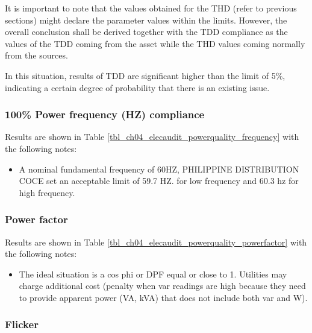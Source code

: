 It is important to note that the values obtained for the THD (refer to previous sections) might declare the parameter values within the limits. However, the overall conclusion shall be derived together with the TDD compliance as the values of the TDD coming from the asset while the THD values coming normally from the sources. 




In this situation, results of TDD are significant higher than the limit of 5\%, indicating a certain degree of probability that there is an existing issue.



\subsubsection{100\% Power frequency (HZ) compliance}

Results are shown in Table \ref{tbl_ch04_elecaudit_powerquality_frequency} with the following notes:

\begin{itemize}
	\item A nominal fundamental frequency of 60HZ, PHILIPPINE DISTRIBUTION COCE set an acceptable limit of 59.7 HZ. for low frequency and 60.3 hz for high frequency.
	
\end{itemize}




\subsubsection{Power factor}

Results are shown in Table \ref{tbl_ch04_elecaudit_powerquality_powerfactor} with the following notes:

\begin{itemize}
	\item The ideal situation is a cos phi or DPF equal or close to 1. Utilities may charge additional cost (penalty when var readings are high because they need to provide apparent power (VA, kVA) that does not include both var and W).
	
\end{itemize}



\subsubsection{Flicker}

